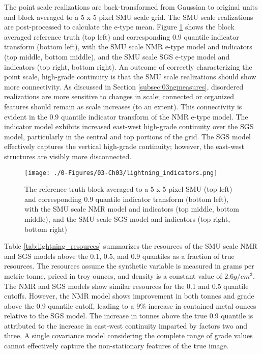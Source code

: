 The point scale realizations are back-transformed from Gaussian to original units and block averaged to a 5 x 5 pixel \gls{SMU} scale grid. The \gls{SMU} scale realizations are post-processed to calculate the e-type mean. Figure \ref{fig:lightning_indicators} shows the block averaged reference truth (top left) and corresponding 0.9 quantile indicator transform (bottom left), with the \gls{SMU} scale \gls{NMR} e-type model and indicators (top middle, bottom middle), and the \gls{SMU} scale \gls{SGS} e-type model and indicators (top right, bottom right). An outcome of correctly characterizing the point scale, high-grade continuity is that the \gls{SMU} scale realizations should show more connectivity. As discussed in Section \ref{subsec:03ngmeasures}, disordered realizations are more sensitive to changes in scale; connected or organized features should remain as scale increases (to an extent). This connectivity is evident in the 0.9 quantile indicator transform of the \gls{NMR} e-type model. The indicator model exhibits increased east-west high-grade continuity over the \gls{SGS} model, particularly in the central and top portions of the grid. The \gls{SGS} model effectively captures the vertical high-grade continuity; however, the east-west structures are visibly more disconnected.

\begin{figure}[htb!]
    \centering
    \texttt{[image: ./0-Figures/03-Ch03/lightning\_indicators.png]}
    \caption{The reference truth block averaged to a 5 x 5 pixel \gls{SMU} (top left) and corresponding 0.9 quantile indicator transform (bottom left), with the \gls{SMU} scale \gls{NMR} model and indicators (top middle, bottom middle), and the \gls{SMU} scale \gls{SGS} model and indicators (top right, bottom right)}
    \label{fig:lightning_indicators}
\end{figure}

Table \ref{tab:lightning_resources} summarizes the resources of the \gls{SMU} scale \gls{NMR} and \gls{SGS} models above the 0.1, 0.5, and 0.9 quantiles as a fraction of true resources. The resources assume the synthetic variable is measured in grams per metric tonne, priced in troy ounces, and density is a constant value of $2.6 g/cm^{3}$. The \gls{NMR} and \gls{SGS} models show similar resources for the 0.1 and 0.5 quantile cutoffs. However, the  \gls{NMR} model shows improvement in both tonnes and grade above the 0.9 quantile cutoff, leading to a 9\% increase in contained metal ounces relative to the \gls{SGS} model. The increase in tonnes above the true 0.9 quantile is attributed to the increase in east-west continuity imparted by factors two and three. A single covariance model considering the complete range of grade values cannot effectively capture the non-stationary features of the true image.

